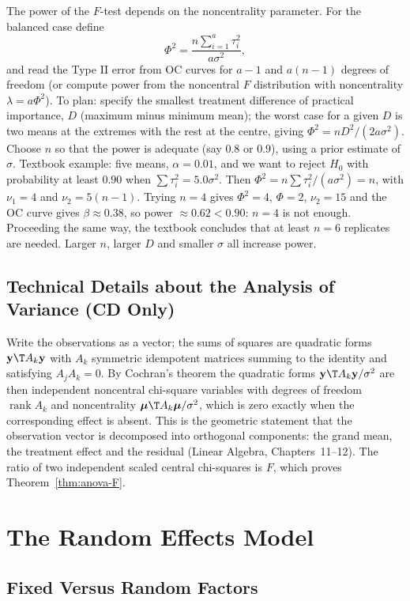 The power of the $F$-test depends on the noncentrality parameter. For the balanced case define
\[ \Phi^2=\frac{n\sum_{i=1}^a\tau_i^2}{a\sigma^2}, \]
and read the Type II error from OC curves for $a-1$ and $a(n-1)$ degrees of freedom (or compute power from the noncentral $F$ distribution with noncentrality $\lambda=a\Phi^2$). To plan: specify the smallest treatment difference of practical importance, $D$ (maximum minus minimum mean); the worst case for a given $D$ is two means at the extremes with the rest at the centre, giving $\Phi^2=nD^2/(2a\sigma^2)$. Choose $n$ so that the power is adequate (say $0.8$ or $0.9$), using a prior estimate of $\sigma$. Textbook example: five means, $\alpha=0.01$, and we want to reject $H_0$ with probability at least $0.90$ when $\sum\tau_i^2=5.0\sigma^2$. Then $\Phi^2=n\sum\tau_i^2/(a\sigma^2)=n$, with $\nu_1=4$ and $\nu_2=5(n-1)$. Trying $n=4$ gives $\Phi^2=4$, $\Phi=2$, $\nu_2=15$ and the OC curve gives $\beta\approx0.38$, so power $\approx0.62<0.90$: $n=4$ is not enough. Proceeding the same way, the textbook concludes that at least $n=6$ replicates are needed. Larger $n$, larger $D$ and smaller $\sigma$ all increase power.

\subsection{Technical Details about the Analysis of Variance (CD Only)}

Write the observations as a vector; the sums of squares are quadratic forms $\mathbf{y}\T A_k\mathbf{y}$ with $A_k$ symmetric idempotent matrices summing to the identity and satisfying $A_jA_k=0$. By Cochran's theorem the quadratic forms $\mathbf{y}\T A_k\mathbf{y}/\sigma^2$ are then independent noncentral chi-square variables with degrees of freedom $\operatorname{rank}A_k$ and noncentrality $\boldsymbol\mu\T A_k\boldsymbol\mu/\sigma^2$, which is zero exactly when the corresponding effect is absent. This is the geometric statement that the observation vector is decomposed into orthogonal components: the grand mean, the treatment effect and the residual (Linear Algebra, Chapters~11--12). The ratio of two independent scaled central chi-squares is $F$, which proves Theorem~\ref{thm:anova-F}.

\section{The Random Effects Model}

\subsection{Fixed Versus Random Factors}

